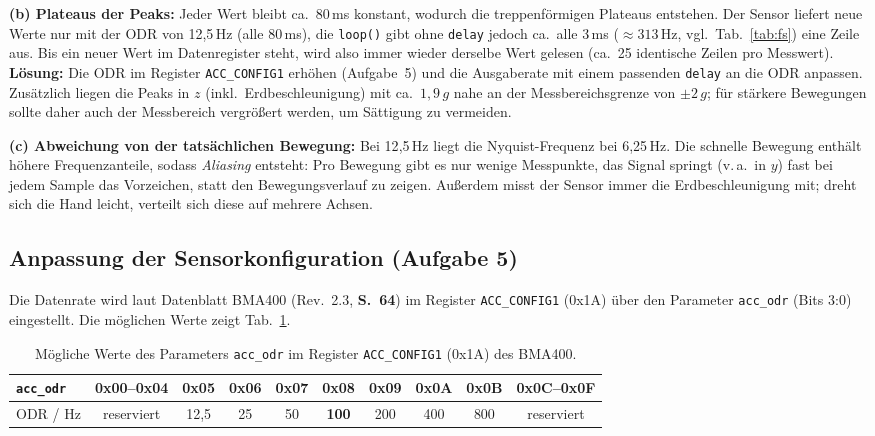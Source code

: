 \documentclass[a4paper,oneside,10pt]{article}
\begin{document}
\textbf{(b) Plateaus der Peaks:} Jeder Wert bleibt ca.\ 80\,ms konstant, wodurch
die treppenförmigen Plateaus entstehen. Der Sensor liefert neue Werte nur mit der
ODR von 12{,}5\,Hz (alle 80\,ms), die \texttt{loop()} gibt ohne \texttt{delay}
jedoch ca.\ alle 3\,ms ($\approx 313$\,Hz, vgl.\ Tab.~\ref{tab:fs}) eine Zeile aus.
Bis ein neuer Wert im Datenregister steht, wird also immer wieder derselbe Wert
gelesen (ca.\ 25 identische Zeilen pro Messwert). \textbf{Lösung:} Die ODR im
Register \texttt{ACC\_CONFIG1} erhöhen (Aufgabe~5) und die Ausgaberate mit einem
passenden \texttt{delay} an die ODR anpassen. Zusätzlich liegen die Peaks in $z$
(inkl.\ Erdbeschleunigung) mit ca.\ $1{,}9\,g$ nahe an der Messbereichsgrenze von
$\pm 2\,g$; für stärkere Bewegungen sollte daher auch der Messbereich vergrößert
werden, um Sättigung zu vermeiden.

\textbf{(c) Abweichung von der tatsächlichen Bewegung:} Bei 12{,}5\,Hz liegt die
Nyquist-Frequenz bei 6{,}25\,Hz. Die schnelle Bewegung enthält höhere
Frequenzanteile, sodass \emph{Aliasing} entsteht: Pro Bewegung gibt es nur wenige
Messpunkte, das Signal springt (v.\,a.\ in $y$) fast bei jedem Sample das Vorzeichen,
statt den Bewegungsverlauf zu zeigen. Außerdem misst der Sensor immer die
Erdbeschleunigung mit; dreht sich die Hand leicht, verteilt sich diese auf
mehrere Achsen.

\subsection{Anpassung der Sensorkonfiguration (Aufgabe 5)}

Die Datenrate wird laut Datenblatt BMA400 \cite{bma400} (Rev.~2.3, \textbf{S.~64})
im Register \texttt{ACC\_CONFIG1} (0x1A) über den Parameter \texttt{acc\_odr}
(Bits 3:0) eingestellt. Die möglichen Werte zeigt Tab.~\ref{tab:odr}.

\begin{table}[H]
\centering
\small
\caption{Mögliche Werte des Parameters \texttt{acc\_odr} im Register \texttt{ACC\_CONFIG1} (0x1A) des BMA400.}
\label{tab:odr}
\begin{tabular}{lccccccccc}
\toprule
\texttt{acc\_odr} & 0x00--0x04 & 0x05 & 0x06 & 0x07 & \textbf{0x08} & 0x09 & 0x0A & 0x0B & 0x0C--0x0F \\
\midrule
ODR / Hz & reserviert & 12{,}5 & 25 & 50 & \textbf{100} & 200 & 400 & 800 & reserviert \\
\bottomrule
\end{tabular}
\end{table}
\end{document}
